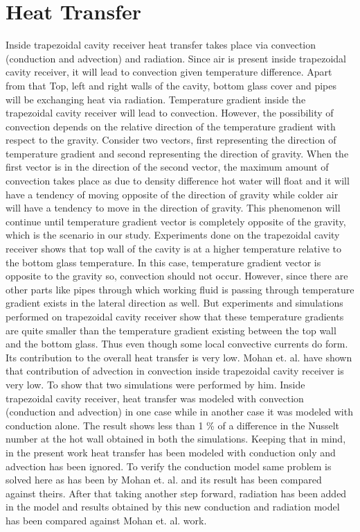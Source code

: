 \chapter{Heat Transfer}\label{ch_Heat_Transfer}
Inside trapezoidal cavity receiver heat transfer takes place via convection (conduction and advection) and radiation. Since air is present inside trapezoidal cavity receiver, it will lead to convection given temperature difference. Apart from that Top, left and right walls of the cavity, bottom glass cover and pipes will be exchanging heat via radiation. Temperature gradient inside the trapezoidal cavity receiver will lead to convection. However, the possibility of convection depends on the relative direction of the temperature gradient with respect to the gravity.  Consider two vectors, first representing the direction of temperature gradient and second representing the direction of gravity. When the first vector is in the direction of the second vector, the maximum amount of convection takes place as due to density difference hot water will float and it will have a tendency of moving opposite of the direction of gravity while colder air will have a tendency to move in the direction of gravity. This phenomenon will continue until temperature gradient vector is completely opposite of the gravity, which is the scenario in our study. Experiments done on the trapezoidal cavity receiver shows that top wall of the cavity is at a higher temperature relative to the bottom glass temperature. In this case, temperature gradient vector is opposite to the gravity so, convection should not occur. However, since there are other parts like pipes through which working fluid is passing through temperature gradient exists in the lateral direction as well. But experiments and simulations performed on trapezoidal cavity receiver show that these temperature gradients are quite smaller than the temperature gradient existing between the top wall and the bottom glass. Thus even though some local convective currents do form. Its contribution to the overall heat transfer is very low. Mohan et. al.\citep{MOHAN201837} have shown that contribution of advection in convection inside trapezoidal cavity receiver is very low. To show that two simulations were performed by him. Inside trapezoidal cavity receiver, heat transfer was modeled with convection (conduction and advection) in one case while in another case it was modeled with conduction alone. The result shows less than 1 \% of a difference in the Nusselt number at the hot wall obtained in both the simulations. Keeping that in mind, in the present work heat transfer has been modeled with conduction only and advection has been ignored. To verify the conduction model same problem is solved here as has been by Mohan et. al.\citep{MOHAN201837} and its result has been compared against theirs. After that taking another step forward, radiation has been added in the model and results obtained by this new conduction and radiation model has been compared against Mohan et. al.\citep{MOHAN201837} work. 


